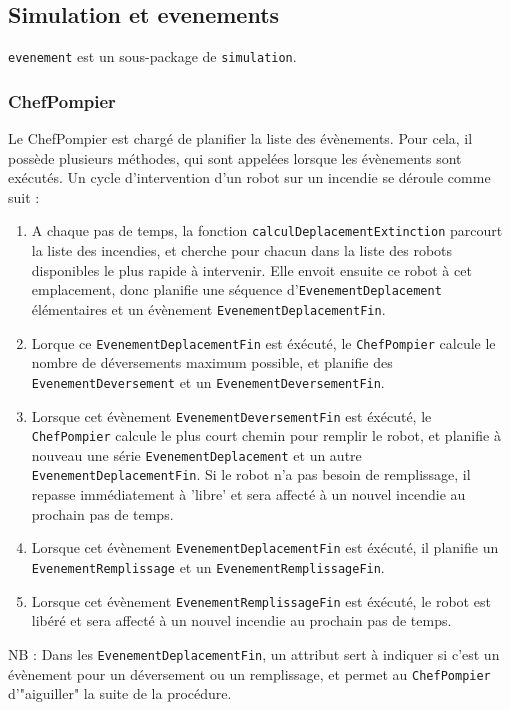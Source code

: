 \documentclass[12pt,a4paper]{article}
\begin{document}
\subsection{Simulation et evenements}

\verb?evenement? est un sous-package de \verb?simulation?.

\subsubsection{ChefPompier}

Le ChefPompier est chargé de planifier la liste des évènements. Pour cela, il possède plusieurs méthodes, qui sont appelées lorsque les évènements sont exécutés. Un cycle d'intervention d'un robot sur un incendie se déroule comme suit : 
\begin{enumerate}
	\item A chaque pas de temps, la fonction \verb?calculDeplacementExtinction? parcourt la liste des incendies, et cherche pour chacun dans la liste des robots disponibles le plus rapide à intervenir. Elle envoit ensuite ce robot à cet emplacement, donc planifie une séquence d'\verb?EvenementDeplacement? élémentaires et un évènement \verb?EvenementDeplacementFin?.
	\item Lorque ce \verb?EvenementDeplacementFin? est éxécuté, le \verb?ChefPompier? calcule le nombre de déversements maximum possible, et planifie des \verb?EvenementDeversement? et un \verb?EvenementDeversementFin?.
	\item Lorsque cet évènement \verb?EvenementDeversementFin? est éxécuté, le \verb?ChefPompier? calcule le plus court chemin pour remplir le robot, et planifie à nouveau une série \verb?EvenementDeplacement? et un autre \verb?EvenementDeplacementFin?. Si le robot n'a pas besoin de remplissage, il repasse immédiatement à 'libre' et sera affecté à un nouvel incendie au prochain pas de temps.
	\item Lorsque cet évènement \verb?EvenementDeplacementFin? est éxécuté, il planifie un \verb?EvenementRemplissage? et un \verb?EvenementRemplissageFin?.
	\item Lorsque cet évènement \verb?EvenementRemplissageFin? est éxécuté, le robot est libéré et sera affecté à un nouvel incendie au prochain pas de temps.
\end{enumerate}

NB : Dans les \verb?EvenementDeplacementFin?, un attribut sert à indiquer si c'est un évènement pour un déversement ou un remplissage, et permet au \verb?ChefPompier? d'"aiguiller" la suite de la procédure.
\end{document}
